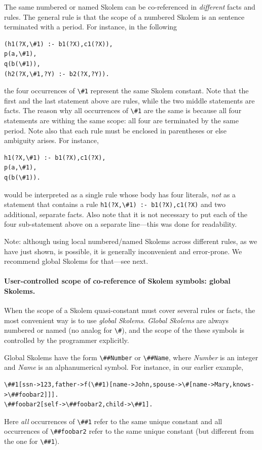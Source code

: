 \documentclass[11pt]{article}
\newcommand{\ERGO}{\mbox{\smaller{\ensuremath{\cal{E}}\smaller{{\sc{RGO}}}}}\xspace}
\newcommand{\FLSYSTEM}{\ERGO}
\newcommand{\bs}{\textbackslash}
\begin{document}
The same numbered or named
Skolem can be co-referenced in \emph{different} facts and
rules.  The general rule is that the scope of a numbered Skolem is an \FLSYSTEM
sentence terminated with a period. For instance, in the following
\begin{verbatim}
(h1(?X,\#1) :- b1(?X),c1(?X)),
p(a,\#1),
q(b(\#1)),
(h2(?X,\#1,?Y) :- b2(?X,?Y)).
\end{verbatim}
the four occurrences of \texttt{\bs{}\#1} represent the same Skolem constant.
Note that the first and the last statement above are rules, while the two
middle statements are facts. The reason why all occurrences of
\texttt{\bs{}\#1} are the same is because all
four statements are withing the same scope: all four are terminated by the
same period. Note also that each rule must be enclosed in parentheses or
else ambiguity arises. For instance,
\begin{verbatim}
h1(?X,\#1) :- b1(?X),c1(?X),
p(a,\#1),
q(b(\#1)).
\end{verbatim}
would be interpreted as a single rule whose body has four literals,
\emph{not} as a statement that contains a rule
\verb|h1(?X,\#1) :- b1(?X),c1(?X)|
and two additional, separate facts.
Also note that it is not necessary to put each of the four sub-statement above 
on a separate line---this was done for readability.

Note: although using local numbered/named Skolems across different rules,
as we have just shown, is possible, it is generally inconvenient and
error-prone. We recommend global Skolems for that---see next.

\paragraph{User-controlled scope of co-reference of Skolem symbols: global
  Skolems.}
When the scope of a Skolem quasi-constant must cover several rules or facts,
the most convenient way is to use \emph{global Skolems}.   
\emph{Global Skolems} are  always numbered or named (no analog for \verb|\#|),
and the scope of
the these symbols is controlled by the programmer explicitly.

\index{\bs{}\#\# - global Skolem}
Global Skolems have the form \texttt{\bs{}\#\#Number} or
\texttt{\bs{}\#\#Name}, where \emph{Number} is an integer and \emph{Name} is
an alphanumerical symbol.  
For instance, in our earlier example,
\begin{verbatim}
\##1[ssn->123,father->f(\##1)[name->John,spouse->\#[name->Mary,knows->\##foobar2]]].
\##foobar2[self->\##foobar2,child->\##1].
\end{verbatim}
Here
\emph{all} occurrences of \texttt{\bs{}\#\#1} refer to the same unique constant
and all occurrences of \texttt{\bs{}\#\#foobar2}
refer to the same unique constant (but different from the one for
\texttt{\bs{}\#\#1}).
\end{document}
